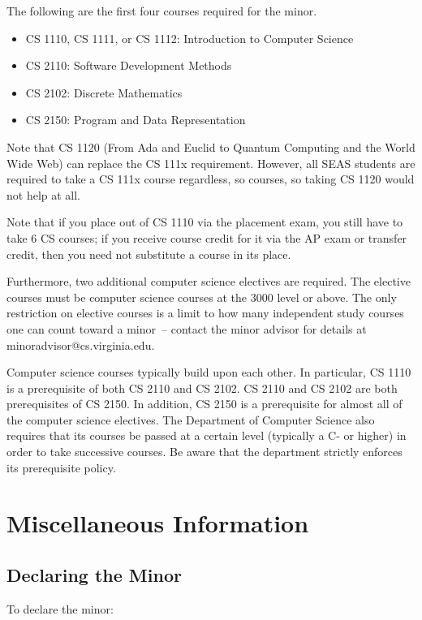 \documentclass[10pt,letter]{book}
\makeatletter
\newenvironment{itemlist}{
\begin{itemize}
\setlength{\itemsep}{0pt}
\setlength{\parskip}{0pt}}
{\end{itemize}}
\newcommand{\csminoradvisoremail}{minoradvisor@cs.virginia.edu}
\newcommand{\mysection}[1]{\section{#1}\renewcommand{\rightmark}{#1}}
\makeatother
\begin{document}
The following are the first four courses required for the minor.

\begin{itemlist} 
\item CS 1110, CS 1111, or CS 1112: Introduction
  to Computer Science
\item CS 2110: Software Development Methods
\item CS 2102: Discrete Mathematics
\item CS 2150: Program and Data Representation
\end{itemlist}

Note that CS 1120 (From Ada and Euclid to Quantum Computing and the
World Wide Web) can replace the CS 111x requirement.  However, all
SEAS students are required to take a CS 111x course regardless, so
courses, so taking CS 1120 would not help at all.

Note that if you place out of CS 1110 via the placement exam,
you still have to take 6 CS courses; if you receive course credit for
it via the AP exam or transfer credit, then you need not substitute a
course in its place.

Furthermore, two additional computer science electives are
required. The elective courses must be computer science courses at the
3000 level or above. The only restriction on elective courses is a
limit to how many independent study courses one can count toward a
minor~-- contact the minor advisor for details at
\csminoradvisoremail.

Computer science courses typically build upon each other. In
particular, CS 1110 is a prerequisite of both CS 2110 and
CS 2102. CS 2110 and CS 2102 are both prerequisites
of CS 2150. In addition, CS 2150 is a prerequisite for
almost all of the computer science electives. The Department of
Computer Science also requires that its courses be passed at a certain
level (typically a C- or higher) in order to take successive
courses. Be aware that the department strictly enforces its
prerequisite policy.

 
\mysection{Miscellaneous Information}
\subsection{Declaring the Minor}

To declare the minor:
\end{document}

